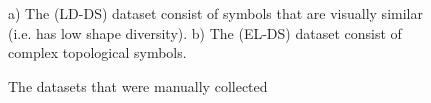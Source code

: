 \documentclass[preprint,10pt,5p,twocolumn]{elsarticle}
\begin{document}
 \begin{figure}
			\hfill
	
	\caption{The datasets that were manually collected}  a)  The (LD-DS) dataset consist of symbols that are visually similar (i.e. has low shape diversity). b) The (EL-DS) dataset consist of complex topological symbols. 
\end{figure}
\end{document}
